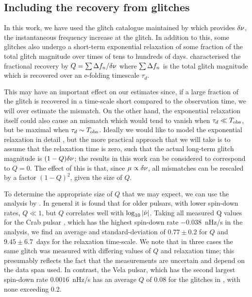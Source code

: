 \documentclass[../full_thesis/full_thesis.tex]{subfiles}
\begin{document}
\subsection{Including the recovery from glitches}
\label{sec: recovery}
In this work, we have used the glitch catalogue maintained by \citet{Espinoza2011}
which provides $\delta\nu$, the instantaneous frequency increase at the
glitch. In addition to this, some glitches also undergo a short-term
exponential relaxation of some fraction of the total glitch magnitude over
times of tens to hundreds of days. \citet{Lyne2000} characterised the
fractional recovery by $Q = \sum \Delta f_n/\delta\nu$ where $\sum
\Delta f_n$ is the total glitch magnitude which is recovered over an
e-folding timescale $\tau_d$.

This may have an important effect on our estimates since, if a large fraction
of the glitch is recovered in a time-scale short compared to the observation
time, we will over estimate the mismatch. On the other hand, the exponential
relaxation itself could also cause an mismatch which would tend to vanish when
$\tau_d \ll T_{\mathrm{obs}}$, but be maximal when $\tau_d \sim T_{\mathrm{obs}}$.  Ideally we would
like to model the exponential relaxation in detail , but the more practical
approach that we will take is to assume that the relaxation time is zero, such
that the actual long-term glitch magnitude is $(1-Q)\delta\nu$; the results in
this work can be considered to correspond to $Q=0$. The effect of this is that,
since $\mu \propto \delta\nu$, all mismatches can be rescaled by a factor
$(1-Q)^{2}$, given the size of $Q$.

To determine the appropriate size of $Q$ that we may expect, we can use the
analysis by \citet{Lyne2000}. In general it is found that for older pulsars,
with lower spin-down rates, $Q\ll1$, but $Q$ correlates well with
$\log_{10}|\dot{\nu}|$. Taking all measured Q values for the Crab pulsar
\citep{Lyne2000, Wang2001, Wang2012}, which has the highest spin-down rate
$-0.038$~nHz/s in the analysis, we find an average and standard-deviation of
$0.77\pm0.2$ for $Q$ and $9.45\pm6.7$~days for the relaxation time-scale. We
note that in three cases the same glitch was measured with differing values of
$Q$ and relaxation time; this presumably reflects the fact that the
measurements are uncertain and depend on the data span used. In contrast, the
Vela pulsar, which has the second largest spin-down rate $0.0016$~nHz/s has an
average $Q$ of 0.08 for the glitches in \citet{Lyne2000}, with none exceeding
0.2.
\end{document}
